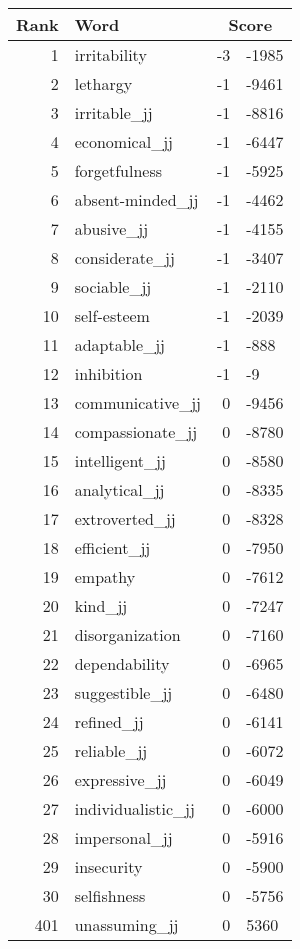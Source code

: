 \begin{longtable}[!htbp]{| rlr@{.}l |}
    \hline
    \textbf{Rank} & \textbf{Word} & \multicolumn{2}{c|}{\textbf{Score}} \\
    \hline
    \endhead
    1 & irritability & -3 & -1985 \\
    2 & lethargy & -1 & -9461 \\
    3 & irritable\_jj & -1 & -8816 \\
    4 & economical\_jj & -1 & -6447 \\
    5 & forgetfulness & -1 & -5925 \\
    6 & absent-minded\_jj & -1 & -4462 \\
    7 & abusive\_jj & -1 & -4155 \\
    8 & considerate\_jj & -1 & -3407 \\
    9 & sociable\_jj & -1 & -2110 \\
    10 & self-esteem & -1 & -2039 \\
    11 & adaptable\_jj & -1 & -888 \\
    12 & inhibition & -1 & -9 \\
    13 & communicative\_jj & 0 & -9456 \\
    14 & compassionate\_jj & 0 & -8780 \\
    15 & intelligent\_jj & 0 & -8580 \\
    16 & analytical\_jj & 0 & -8335 \\
    17 & extroverted\_jj & 0 & -8328 \\
    18 & efficient\_jj & 0 & -7950 \\
    19 & empathy & 0 & -7612 \\
    20 & kind\_jj & 0 & -7247 \\
    21 & disorganization & 0 & -7160 \\
    22 & dependability & 0 & -6965 \\
    23 & suggestible\_jj & 0 & -6480 \\
    24 & refined\_jj & 0 & -6141 \\
    25 & reliable\_jj & 0 & -6072 \\
    26 & expressive\_jj & 0 & -6049 \\
    27 & individualistic\_jj & 0 & -6000 \\
    28 & impersonal\_jj & 0 & -5916 \\
    29 & insecurity & 0 & -5900 \\
    30 & selfishness & 0 & -5756 \\
    401 & unassuming\_jj & 0 & 5360 \\

\end{longtable}
